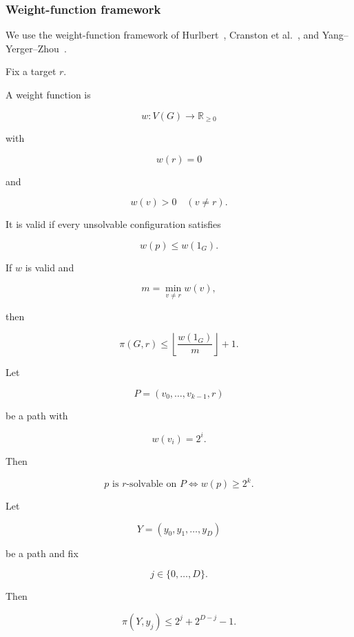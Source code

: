 \subsubsection{Weight-function framework}


We use the weight-function framework of
Hurlbert~\cite{Hurlbert2017},
Cranston et al.~\cite{Cranston2017},
and Yang--Yerger--Zhou~\cite{YYZ2024}.


Fix a target $r$.

A weight function is

\[
w:V(G)\rightarrow\mathbb R_{\ge0}
\]

with

\[
w(r)=0
\]

and

\[
w(v)>0\quad(v\neq r).
\]


It is valid if every unsolvable configuration satisfies

\[
w(p)\le w(1_G).
\]


\begin{lemma}
\label{lem:wf-bound}

If $w$ is valid and

\[
m=\min_{v\neq r}w(v),
\]

then

\[
\pi(G,r)
\le
\left\lfloor\frac{w(1_G)}m\right\rfloor+1 .
\]

\end{lemma}



\begin{lemma}
\label{lem:yyz-path}

Let

\[
P=(v_0,\ldots,v_{k-1},r)
\]

be a path with

\[
w(v_i)=2^i .
\]

Then

\[
p\text{ is }r\text{-solvable on }P
\Longleftrightarrow
w(p)\ge2^k .
\]

\end{lemma}



\begin{lemma}
\label{lem:two-arm}

Let

\[
Y=(y_0,y_1,\ldots,y_D)
\]

be a path and fix

\[
j\in\{0,\ldots,D\}.
\]

Then

\[
\pi(Y,y_j)\le2^j+2^{D-j}-1 .
\]

\end{lemma}


